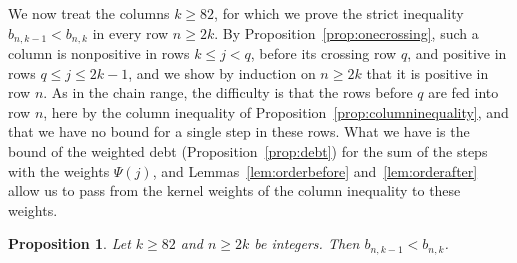 \documentclass{amsart}
\newtheorem{proposition}[theorem]{Proposition}
\theoremstyle{definition}
\theoremstyle{remark}
\numberwithin{equation}{section}
\begin{document}
We now treat the columns $k\ge 82$, for which we prove the strict inequality $b_{n,k-1}<b_{n,k}$ in every row $n\ge 2k$. By Proposition~\ref{prop:onecrossing}, such a column is nonpositive in rows $k\le j<q$, before its crossing row $q$, and positive in rows $q\le j\le 2k-1$, and we show by induction on $n\ge 2k$ that it is positive in row $n$. As in the chain range, the difficulty is that the rows before $q$ are fed into row $n$, here by the column inequality of Proposition~\ref{prop:columninequality}, and that we have no bound for a single step in these rows. What we have is the bound of the weighted debt (Proposition~\ref{prop:debt}) for the sum of the steps with the weights $\Psi(j)$, and Lemmas~\ref{lem:orderbefore} and~\ref{lem:orderafter} allow us to pass from the kernel weights of the column inequality to these weights.

\begin{proposition}\label{prop:largecolumns}
Let $k\ge 82$ and $n\ge 2k$ be integers. Then $b_{n,k-1}<b_{n,k}$.
\end{proposition}
\end{document}
